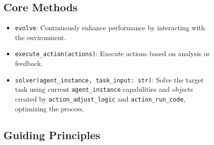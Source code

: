 \begin{figure}[ht]
\begin{tcolorbox}[colback=black!15!white, colframe=black, title=Goal Prompt of \framework]
\subsection*{\textbf{Core Methods}}

\begin{itemize}[leftmargin=*,itemsep=1pt]
    \item \texttt{evolve}: Continuously enhance performance by interacting with the environment.
    \item \texttt{execute\_action(actions)}: Execute actions based on analysis or feedback.
    \item \texttt{solver(agent\_instance, task\_input: str)}: Solve the target task using current \texttt{agent\_instance} capabilities and objects created by \texttt{action\_adjust\_logic} and \texttt{action\_run\_code}, optimizing the process.
\end{itemize}

\subsection*{\textbf{Guiding Principles}}


\end{tcolorbox}
\end{figure}

